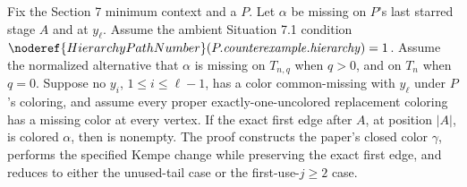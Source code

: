 \begin{lemma}
Fix the Section 7 minimum context and a
 \(P\).  Let \(\alpha\) be
missing on \(P\)'s last starred stage \(A\) and at \(y_\ell\).  Assume
the ambient Situation 7.1 condition
\(\noderef{HierarchyPathNumber}
(P.\mathit{counterexample}.\mathit{hierarchy})=1\).  Assume
the normalized alternative that \(\alpha\) is missing on \(T_{n,q}\)
when \(q>0\), and on \(T_n\) when \(q=0\).  Suppose no
\(y_i\), \(1\leq i\leq\ell-1\), has a color common-missing with
\(y_\ell\) under \(P\)'s coloring, and assume every proper
exactly-one-uncolored replacement coloring has a missing color at every
vertex.  If the exact first edge after \(A\), at position \(|A|\), is
colored \(\alpha\), then
 is nonempty.
The proof constructs the paper's closed color \(\gamma\), performs the
specified Kempe change while preserving the exact first edge, and reduces
to either the unused-tail case or the first-use-\(j\geq2\) case.
\end{lemma}
